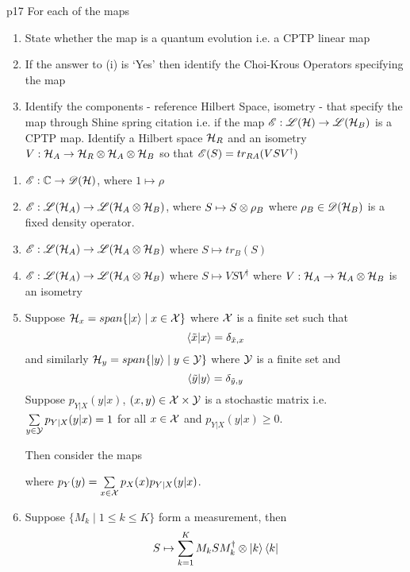 \documentclass[a4paper, 11pt]{article}
\begin{document}
\begin{problem}{%
	}{p17%
	}
	For each of the maps \begin{enumerate}[label=(\roman*)]
		\item State whether the map is a quantum evolution i.e. a CPTP linear map
		\item If the answer to (i) is `Yes' then identify the Choi-Krous Operators specifying the map
		\item Identify the components - reference Hilbert Space, isometry - that specify the map through Shine spring citation i.e. if the map ${\mathscr{E}}:{\mathscr{L}}(\mathcal{H})\to {\mathscr{L}}(\mathcal{H}_B)$ is a CPTP map. Identify a Hilbert space $\mathcal{H}_R$ and an isometry $V:\mathcal{H}_A\to \mathcal{H}_R\otimes \mathcal{H}_A\otimes \mathcal{H}_B$ so that ${\mathscr{E}}(S)=tr_{RA}(VSV^{\dagger})$
	\end{enumerate}
		\begin{enumerate}[label=(\arabic*)]
			\item ${\mathscr{E}}:\mathbb{C}\to {\mathscr{D}}(\mathcal{H})$, where $1\mapsto \rho$
			\item ${\mathscr{E}}:{\mathscr{L}}(\mathcal{H}_A)\to {\mathscr{L}}(\mathcal{H}_A\otimes \mathcal{H}_B)$, where $S\mapsto S\otimes \rho_B$ where $\rho_B\in {\mathscr{D}}(\mathcal{H}_B)$ is a fixed density operator.
			\item ${\mathscr{E}}:{\mathscr{L}}(\mathcal{H}_A)\to {\mathscr{L}}(\mathcal{H}_A\otimes \mathcal{H}_B)$ where $S\mapsto tr_B(S)$
			\item ${\mathscr{E}}:{\mathscr{L}}(\mathcal{H}_A)\to {\mathscr{L}}(\mathcal{H}_A\otimes \mathcal{H}_B)$ where $S\mapsto VSV^{\dagger}$ where $V:\mathcal{H}_A\to\mathcal{H}_A\otimes \mathcal{H}_B$ is an isometry
			\item Suppose $\mathcal{H}_x=span\{\ket{x}\mid x\in \mathcal{X}\}$ where $\mathcal{X}$ is a finite set such that $$\bra{\tilde{x}}\ket{x}=\delta_{\tilde{x},x}$$and similarly $\mathcal{H}_y = span\{\ket{y}\mid y\in \mathcal{Y}\}$ where $\mathcal{Y}$ is a finite set and $$\bra{\tilde{y}}\ket{y}=\delta_{\tilde{y},y}$$Suppose $p_{Y|X}(y|x)$, $(x,y)\in \mathcal{X}\times \mathcal{Y}$ is a stochastic matrix i.e. $\sum\limits_{y\in \mathcal{Y}}p_{Y|X}(y|x)=1$ for all $x\in \mathcal{X}$ and $p_{Y|X}(y|x)\geq 0$.
				
			Then consider the maps \begin{center}
			\end{center}where $p_Y(y)=\sum\limits_{x\in \mathcal{X}}p_X(x)p_{Y|X}(y|x)$.
			\item Suppose $\{M_k\mid 1\leq k\leq K\}$ form a measurement, then $$S\mapsto \sum_{k=1}^KM_kSM_k^{\dagger}\otimes \ket{k}\bra{k}$$
		\end{enumerate}

\end{problem}
\end{document}
